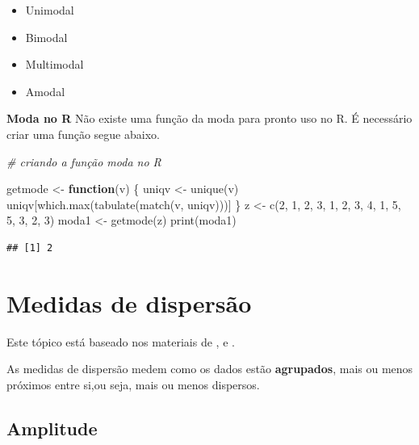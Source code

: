 \documentclass[
]{book}
\newenvironment{Shaded}{\begin{snugshade}}{\end{snugshade}}
\newcommand{\CommentTok}[1]{\textcolor[rgb]{0.56,0.35,0.01}{\textit{#1}}}
\newcommand{\ControlFlowTok}[1]{\textcolor[rgb]{0.13,0.29,0.53}{\textbf{#1}}}
\newcommand{\DecValTok}[1]{\textcolor[rgb]{0.00,0.00,0.81}{#1}}
\newcommand{\FunctionTok}[1]{\textcolor[rgb]{0.00,0.00,0.00}{#1}}
\newcommand{\NormalTok}[1]{#1}
\newcommand{\OtherTok}[1]{\textcolor[rgb]{0.56,0.35,0.01}{#1}}
\providecommand{\tightlist}{%
  \setlength{\itemsep}{0pt}\setlength{\parskip}{0pt}}
\begin{document}
\begin{itemize}
\tightlist
\item
  Unimodal
\item
  Bimodal
\item
  Multimodal
\item
  Amodal
\end{itemize}

\textbf{Moda no R}
Não existe uma função da moda para pronto uso no R. É necessário criar uma função
segue abaixo.

\begin{Shaded}
\begin{Highlighting}[]
\CommentTok{\# criando a função moda no R}

\NormalTok{getmode }\OtherTok{\textless{}{-}} \ControlFlowTok{function}\NormalTok{(v) \{}
\NormalTok{    uniqv }\OtherTok{\textless{}{-}} \FunctionTok{unique}\NormalTok{(v)}
\NormalTok{    uniqv[}\FunctionTok{which.max}\NormalTok{(}\FunctionTok{tabulate}\NormalTok{(}\FunctionTok{match}\NormalTok{(v, uniqv)))]}
\NormalTok{\}}
\NormalTok{z }\OtherTok{\textless{}{-}} \FunctionTok{c}\NormalTok{(}\DecValTok{2}\NormalTok{, }\DecValTok{1}\NormalTok{, }\DecValTok{2}\NormalTok{, }\DecValTok{3}\NormalTok{, }\DecValTok{1}\NormalTok{, }\DecValTok{2}\NormalTok{, }\DecValTok{3}\NormalTok{, }\DecValTok{4}\NormalTok{, }\DecValTok{1}\NormalTok{, }\DecValTok{5}\NormalTok{, }\DecValTok{5}\NormalTok{, }\DecValTok{3}\NormalTok{, }\DecValTok{2}\NormalTok{, }\DecValTok{3}\NormalTok{)}
\NormalTok{moda1 }\OtherTok{\textless{}{-}} \FunctionTok{getmode}\NormalTok{(z)}
\FunctionTok{print}\NormalTok{(moda1)}
\end{Highlighting}
\end{Shaded}

\begin{verbatim}
## [1] 2
\end{verbatim}

\hypertarget{medidas-de-dispersuxe3o}{%
\section{Medidas de dispersão}\label{medidas-de-dispersuxe3o}}

Este tópico está baseado nos materiais de \citet{Hoffmann2006}, \citet{Morettin2013} e \citet{Sartoris2013}.

As medidas de dispersão medem como os dados estão \textbf{agrupados}, mais ou menos próximos entre si,ou
seja, mais ou menos dispersos.

\hypertarget{amplitude}{%
\subsection{Amplitude}\label{amplitude}}
\end{document}
